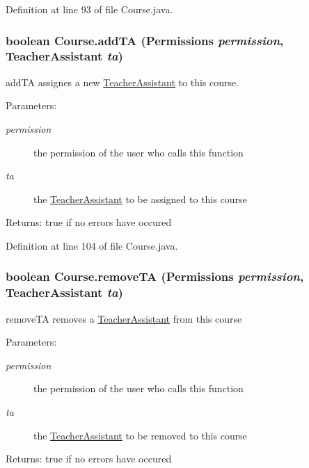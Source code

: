 Definition at line 93 of file Course.java.\hypertarget{classCourse_fa902d10778aabf551c83b7330de82ee}{
\subsubsection{\setlength{\rightskip}{0pt plus 5cm}boolean Course.addTA ({\bf Permissions} {\em permission}, \/  {\bf TeacherAssistant} {\em ta})}}
\label{classCourse_fa902d10778aabf551c83b7330de82ee}


addTA assignes a new \hyperlink{classTeacherAssistant}{TeacherAssistant} to this course. 

\begin{Desc}
\item[Parameters:]
\begin{description}
\item[{\em permission}]the permission of the user who calls this function \item[{\em ta}]the \hyperlink{classTeacherAssistant}{TeacherAssistant} to be assigned to this course \end{description}
\end{Desc}
\begin{Desc}
\item[Returns:]true if no errors have occured \end{Desc}


Definition at line 104 of file Course.java.\hypertarget{classCourse_75709fa5448678e86d780b1a9f6f73ad}{
\subsubsection{\setlength{\rightskip}{0pt plus 5cm}boolean Course.removeTA ({\bf Permissions} {\em permission}, \/  {\bf TeacherAssistant} {\em ta})}}
\label{classCourse_75709fa5448678e86d780b1a9f6f73ad}


removeTA removes a \hyperlink{classTeacherAssistant}{TeacherAssistant} from this course 

\begin{Desc}
\item[Parameters:]
\begin{description}
\item[{\em permission}]the permission of the user who calls this function \item[{\em ta}]the \hyperlink{classTeacherAssistant}{TeacherAssistant} to be removed to this course \end{description}
\end{Desc}
\begin{Desc}
\item[Returns:]true if no errors have occured \end{Desc}


